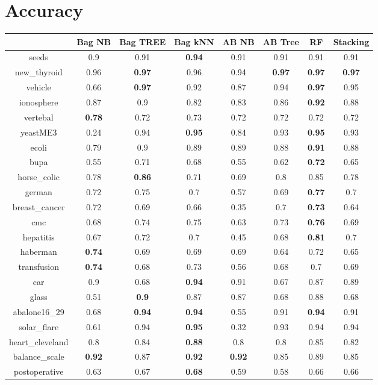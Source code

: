 \documentclass{article}%
\begin{document}
%
\normalsize%
\section*{Accuracy}%
\begin{tabular}{c|ccccccc}%
&Bag NB&Bag TREE&Bag kNN&AB NB&AB Tree&RF&Stacking\\%
\hline%
seeds&0.9&0.91&\textbf{0.94}&0.91&0.91&0.91&0.91\\%
new\_thyroid&0.96&\textbf{0.97}&0.96&0.94&\textbf{0.97}&\textbf{0.97}&\textbf{0.97}\\%
vehicle&0.66&\textbf{0.97}&0.92&0.87&0.94&\textbf{0.97}&0.95\\%
ionosphere&0.87&0.9&0.82&0.83&0.86&\textbf{0.92}&0.88\\%
vertebal&\textbf{0.78}&0.72&0.73&0.72&0.72&0.72&0.72\\%
yeastME3&0.24&0.94&\textbf{0.95}&0.84&0.93&\textbf{0.95}&0.93\\%
ecoli&0.79&0.9&0.89&0.89&0.88&\textbf{0.91}&0.88\\%
bupa&0.55&0.71&0.68&0.55&0.62&\textbf{0.72}&0.65\\%
horse\_colic&0.78&\textbf{0.86}&0.71&0.69&0.8&0.85&0.78\\%
german&0.72&0.75&0.7&0.57&0.69&\textbf{0.77}&0.7\\%
breast\_cancer&0.72&0.69&0.66&0.35&0.7&\textbf{0.73}&0.64\\%
cmc&0.68&0.74&0.75&0.63&0.73&\textbf{0.76}&0.69\\%
hepatitis&0.67&0.72&0.7&0.45&0.68&\textbf{0.81}&0.7\\%
haberman&\textbf{0.74}&0.69&0.69&0.69&0.64&0.72&0.65\\%
transfusion&\textbf{0.74}&0.68&0.73&0.56&0.68&0.7&0.69\\%
car&0.9&0.68&\textbf{0.94}&0.91&0.67&0.87&0.89\\%
glass&0.51&\textbf{0.9}&0.87&0.87&0.68&0.88&0.68\\%
abalone16\_29&0.68&\textbf{0.94}&\textbf{0.94}&0.55&0.91&\textbf{0.94}&0.91\\%
solar\_flare&0.61&0.94&\textbf{0.95}&0.32&0.93&0.94&0.94\\%
heart\_cleveland&0.8&0.84&\textbf{0.88}&0.8&0.8&0.85&0.82\\%
balance\_scale&\textbf{0.92}&0.87&\textbf{0.92}&\textbf{0.92}&0.85&0.89&0.85\\%
postoperative&0.63&0.67&\textbf{0.68}&0.59&0.58&0.66&0.66\\%
\end{tabular}
\end{document}

